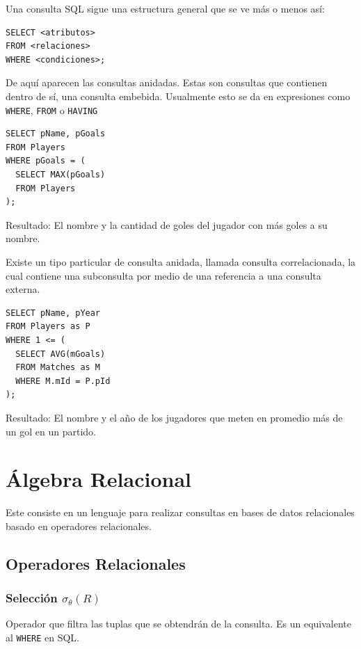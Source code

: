 Una consulta SQL sigue una estructura general que se ve más o menos así:
\begin{verbatim}
SELECT <atributos>
FROM <relaciones>
WHERE <condiciones>;
\end{verbatim}

De aquí aparecen las consultas anidadas. Estas son consultas que contienen dentro de sí, una consulta embebida. Usualmente esto se da en expresiones como \texttt{WHERE}, \texttt{FROM} o \texttt{HAVING}
\begin{tcolorbox} [
  width=\textwidth,
  title={Ejemplo},
  colbacktitle=gray
]
  \begin{verbatim}
SELECT pName, pGoals
FROM Players
WHERE pGoals = (
  SELECT MAX(pGoals)
  FROM Players
);
  \end{verbatim}
  Resultado: El nombre y la cantidad de goles del jugador con más goles a su nombre.
\end{tcolorbox}

Existe un tipo particular de consulta anidada, llamada consulta correlacionada, la cual contiene una subconsulta por medio de una referencia a una consulta externa.
\begin{tcolorbox} [
  width=\textwidth,
  title={Ejemplo},
  colbacktitle=gray
]
  \begin{verbatim}
SELECT pName, pYear
FROM Players as P
WHERE 1 <= (
  SELECT AVG(mGoals)
  FROM Matches as M
  WHERE M.mId = P.pId
);
  \end{verbatim}
  Resultado: El nombre y el año de los jugadores que meten en promedio más de un gol en un partido.
\end{tcolorbox}

\section{Álgebra Relacional}
Este consiste en un lenguaje para realizar consultas en bases de datos relacionales basado en operadores relacionales.

\subsection{Operadores Relacionales}
\subsubsection{Selección $\sigma_\theta(R)$}
Operador que filtra las tuplas que se obtendrán de la consulta. Es un equivalente al \texttt{WHERE} en SQL.

